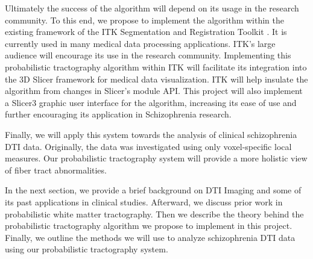 Ultimately the success of the algorithm will depend on its usage in the research community.  To this end, we propose to implement the algorithm within the existing framework of the ITK Segmentation and Registration Toolkit \cite{itk}.  It is currently used in many medical data processing applications.  ITK's large audience will encourage its use in the research community.  Implementing this probabilistic tractography algorithm within ITK will facilitate its integration into the 3D Slicer framework \cite{3Dslicer} for medical data visualization.  ITK will help insulate the algorithm from changes in Slicer's module API.  This project will also implement a Slicer3 graphic user interface for the algorithm, increasing its ease of use and further encouraging its application in Schizophrenia research.

Finally, we will apply this system towards the analysis of clinical schizophrenia DTI data.  Originally, the data was investigated using only voxel-specific local measures.  Our probabilistic tractography system will provide a more holistic view of fiber tract abnormalities.

In the next section, we provide a brief background on DTI Imaging and some of its past applications in clinical studies.  Afterward, we discuss prior work in probabilistic white matter tractography.  Then we describe the theory behind the probabilistic tractography algorithm we propose to implement in this project. Finally, we outline the methods we will use to analyze schizophrenia DTI data using our probabilistic tractography system.


